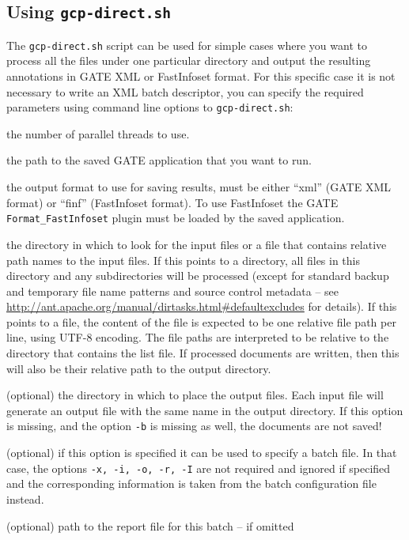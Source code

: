 \subsection{Using {\tt gcp-direct.sh}}
\label{sec:running:gcp-direct}

The \verb!gcp-direct.sh! script can be used for simple cases where you want to
process all the files under one particular directory and output the resulting
annotations in GATE XML or FastInfoset format.  For this specific case it is
not necessary to write an XML batch descriptor, you can specify the required
parameters using command line options to \verb!gcp-direct.sh!:

\bde
\item[-t] the number of parallel threads to use.
\item[-x] the path to the saved GATE application that you want to run.
\item[-f] the output format to use for saving results, must be either ``xml''
  (GATE XML format) or ``finf'' (FastInfoset format).  To use FastInfoset the
  GATE \verb!Format_FastInfoset! plugin must be loaded by the saved
  application.
\item[-i] the directory in which to look for the input files or a file that contains
  relative path names to the input files. If this points to a directory, all files in
  this directory and any subdirectories will be processed (except for standard
  backup and temporary file name patterns and source control metadata -- see
  \url{http://ant.apache.org/manual/dirtasks.html#defaultexcludes} for
  details). If this points to a file, the content of the file is expected to be 
  one relative file path per line, using UTF-8 encoding. The file paths are 
  interpreted to be relative to the directory that contains the list file.
  If processed documents are written, then this will also be their relative 
  path to the output directory. 
\item[-o] (optional) the directory in which to place the output files.  Each input file
  will generate an output file with the same name in the output directory.
  If this option is missing, and the option \texttt{-b} is missing as well,
  the documents are not saved!
\item[-b] (optional) if this option is specified it can be used to specify
  a batch file. In that case, the options \texttt{-x, -i, -o, -r, -I} are 
  not required and ignored if specified and the corresponding information is
  taken from the batch configuration file instead.
\item[-r] (optional) path to the report file for this batch -- if omitted
